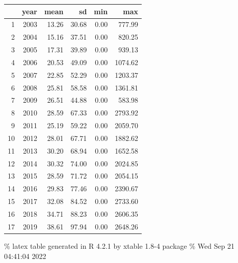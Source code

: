 \documentclass[
]{article}
\begin{document}
\begin{table}[ht]
\centering
\begin{tabular}{rrrrrr}
  \hline
 & year & mean & sd & min & max \\ 
  \hline
1 & 2003 & 13.26 & 30.68 & 0.00 & 777.99 \\ 
  2 & 2004 & 15.16 & 37.51 & 0.00 & 820.25 \\ 
  3 & 2005 & 17.31 & 39.89 & 0.00 & 939.13 \\ 
  4 & 2006 & 20.53 & 49.09 & 0.00 & 1074.62 \\ 
  5 & 2007 & 22.85 & 52.29 & 0.00 & 1203.37 \\ 
  6 & 2008 & 25.81 & 58.58 & 0.00 & 1361.81 \\ 
  7 & 2009 & 26.51 & 44.88 & 0.00 & 583.98 \\ 
  8 & 2010 & 28.59 & 67.33 & 0.00 & 2793.92 \\ 
  9 & 2011 & 25.19 & 59.22 & 0.00 & 2059.70 \\ 
  10 & 2012 & 28.01 & 67.71 & 0.00 & 1882.62 \\ 
  11 & 2013 & 30.20 & 68.94 & 0.00 & 1652.58 \\ 
  12 & 2014 & 30.32 & 74.00 & 0.00 & 2024.85 \\ 
  13 & 2015 & 28.59 & 71.72 & 0.00 & 2054.15 \\ 
  14 & 2016 & 29.83 & 77.46 & 0.00 & 2390.67 \\ 
  15 & 2017 & 32.08 & 84.52 & 0.00 & 2733.60 \\ 
  16 & 2018 & 34.71 & 88.23 & 0.00 & 2606.35 \\ 
  17 & 2019 & 38.61 & 97.94 & 0.00 & 2648.26 \\ 
   \hline
\end{tabular}
\end{table}

\% latex table generated in R 4.2.1 by xtable 1.8-4 package \% Wed Sep
21 04:41:04 2022
\end{document}
